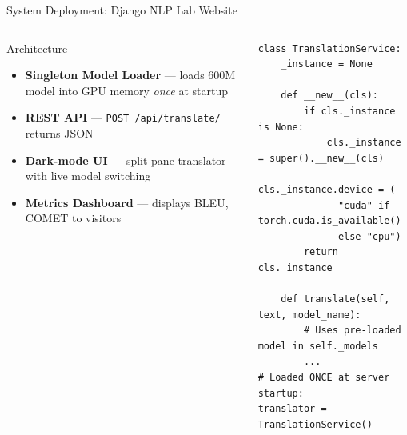 \documentclass[aspectratio=169]{beamer}
\begin{document}
\begin{frame}[fragile]{System Deployment: Django NLP Lab Website}
\begin{columns}[T]
    \begin{block}{Architecture}
      \begin{itemize}
        \item \textbf{Singleton Model Loader} — loads 600M model into GPU memory \textit{once} at startup
        \item \textbf{REST API} — \texttt{POST /api/translate/} returns JSON
        \item \textbf{Dark-mode UI} — split-pane translator with live model switching
        \item \textbf{Metrics Dashboard} — displays BLEU, COMET to visitors
      \end{itemize}
    \end{block}
\begin{lstlisting}[style=pythonstyle]
class TranslationService:
    _instance = None

    def __new__(cls):
        if cls._instance is None:
            cls._instance = super().__new__(cls)
            cls._instance.device = (
              "cuda" if torch.cuda.is_available()
              else "cpu")
        return cls._instance

    def translate(self, text, model_name):
        # Uses pre-loaded model in self._models
        ...
# Loaded ONCE at server startup:
translator = TranslationService()
\end{lstlisting}
\end{columns}
\end{frame}
\end{document}
